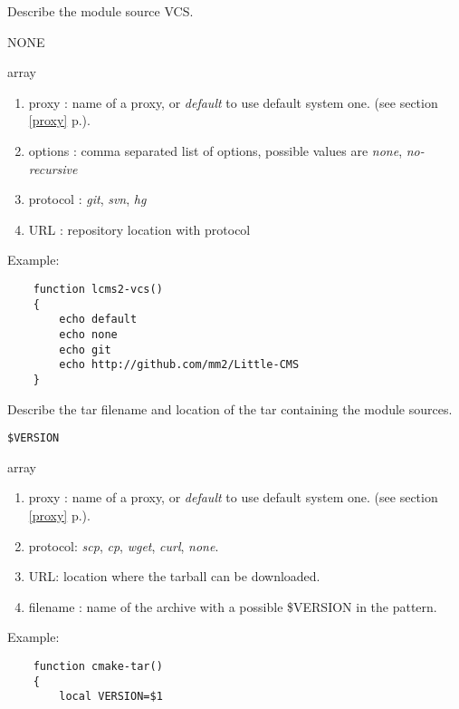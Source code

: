 \documentclass[a4paper,12pt,twoside]{article}
\newcommand{\code}[1]{\texttt{#1}}
\renewcommand{\emph}[1]{\textit{#1}}
\newcommand{\seeref}[1]{see section \ref{#1} p.\pageref{#1}}
\begin{document}
\begin{description}[font=\large\texttt]

	\item[<module>-vcs] Describe the module source VCS.
	\begin{description}[font=\textit,style=standard]
		\item[parameter] \tabto{2cm} NONE
		\item[return] \tabto{2cm} array
		\begin{enumerate}
			\item proxy : name of a proxy, or \emph{default} to use default system one. (\seeref{proxy}).
			\item options : comma separated list of options, possible values are \emph{none}, \emph{no-recursive}
			\item protocol : \emph{git}, \emph{svn}, \emph{hg}
			\item URL : repository location with protocol
		\end{enumerate}
	\end{description}

	Example:
	\begin{lstlisting}
	function lcms2-vcs()
	{
		echo default
		echo none
		echo git
		echo http://github.com/mm2/Little-CMS
	}
	\end{lstlisting}

	\item[<module>-tar] Describe the tar filename and location of the tar containing the module sources.
	\begin{description}[font=\textit,style=standard]
		\item[parameter] \tabto{2cm} \code{\$VERSION}
		\item[return] \tabto{2cm} array
		\begin{enumerate}
		\item proxy : name of a proxy, or \emph{default} to use default system one. (\seeref{proxy}).
		\item protocol: \emph{scp}, \emph{cp}, \emph{wget}, \emph{curl}, \emph{none}.
		\item URL: location where the tarball can be downloaded.
		\item filename : name of the archive with a possible \$VERSION in the pattern.
		\end{enumerate}
	\end{description}

	Example:
	\begin{lstlisting}
	function cmake-tar()
	{
		local VERSION=$1


\end{lstlisting}
\end{description}
\end{document}
